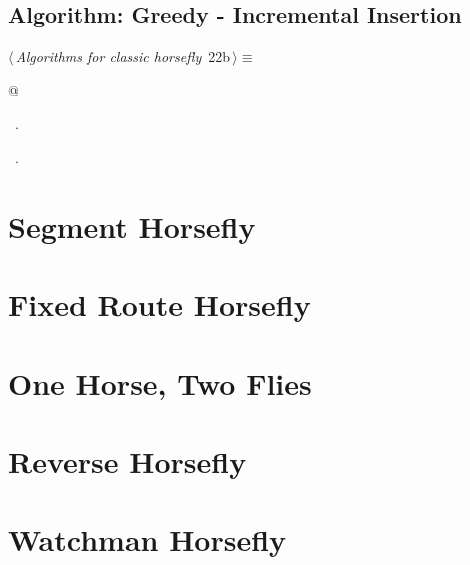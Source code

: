 \documentclass[12pt]{report}
\begin{document}
\section{Algorithm: Greedy - Incremental Insertion} \blindtext 
\begin{flushleft} \small
\begin{minipage}{\linewidth}\label{scrap12}\raggedright\small
{} $\langle\,${\itshape Algorithms for classic horsefly}\nobreak\ {\footnotesize {22b}}$\,\rangle\equiv$
\vspace{-1ex}
\begin{list}{}{} \item
\mbox{}\verb@   @\\
\mbox{}\verb@@{\NWsep}
\end{list}
\vspace{-1.5ex}
\footnotesize
\begin{list}{}{\setlength{\itemsep}{-\parsep}\setlength{\itemindent}{-\leftmargin}}
\item \NWtxtMacroDefBy\ .
\item \NWtxtMacroRefIn\ .

\item{}
\end{list}
\end{minipage}\vspace{4ex}
\end{flushleft}
\chapter{Segment Horsefly}
\label{chap:segment-horsefly}\chapter{Fixed Route Horsefly}
\label{chap:fixed-route-horsefly}\chapter{One Horse, Two Flies}
\label{chap:one-horse-two-flies}
\chapter{Reverse Horsefly}
\label{chap:reverse-horsefly}\chapter{Watchman Horsefly}
\label{watchman-horsefly}
\end{document}
